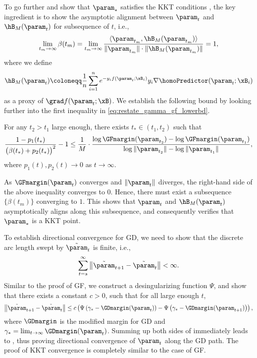 To go further and show that $\param_*$ satisfies the KKT conditions , the key ingredient is to show the asymptotic alignment between $\param_t$ and $\hB_M(\param_t)$ for subsequence of $t$, i.e., 
\[
\lim_{t_m\to \infty}\beta(t_m) = \lim_{t_m\to \infty} \frac{\langle\param_{t_m}, \hB_M(\param_{t_m}) \rangle}{ \|\param_{t_m}\| \cdot \|\hB_M(\param_{t_m})\|} = 1,
\]
where we define
\begin{equation*}
    \hB_M(\param_t) \coloneqq  \frac{1}{n}\sum_{i=1}^n e^{-y_i f(\param_t;\xB_i)} y_i\nabla \homoPredictor(\param_t;\xB_i)
\end{equation*}
as a proxy of $\grad f (\param_t; \xB)$.
We establish the following bound by looking further into the first inequality in \cref{eq:restate_gamma_gf_lowerbd}. 
\begin{lemma} For any $t_2>t_1$ large enough, there exists $t_*\in (t_1,t_2)$ such that 
\[
    \frac{1 - p_1(t_*)}{\big(\beta(t_*) + p_2(t_*) \big)^2}-1 \le \frac{1}{M} \cdot \frac{\log \GFmargin(\param_{t_2}) - \log\GFmargin(\param_{t_1})}{\log \|\param_{t_2}\| - \log \|\param_{t_1}\|}, 
\]
where $p_1(t), p_2(t) \to 0$ as $t\to \infty$. 
\end{lemma}
As $\GFmargin (\param_t)$ converges and $\|\param_t\|$ diverges, the right-hand side of the above inequality converges to $0$. Hence, there must exist a subsequence $\{ \beta(t_m) \}$ converging to $1$. This shows that $\param_t$ and $\hB_M(\param_t)$ asymptotically aligns along this subsequence, and consequently verifies that $\param_*$ is a KKT point.

To establish directional convergence for GD, we need to show that the discrete arc length swept by $\tilde{\param}_t$ is finite, i.e., 
\begin{equation}\label{eq:gd_sketch_finite_arc}
    \sum_{t=s}^{\infty} \left\| \tilde{\param}_{t+1} - \tilde{\param}_t \right\| < \infty.
\end{equation}
Similar to the proof of GF, we construct a desingularizing function $\Psi$, and show that there exists a constant $c > 0$, such that for all large enough $t$,
\begin{equation}\label{eq:gd_sketch_desingular}
     \left\| \tilde{\param}_{t+1} - \tilde{\param}_t \right\| \leq c \left( \Psi \left(\gamma_*-\GDmargin (\param_t) \right) - \Psi \left(\gamma_*-\GDmargin (\param_{t+1}) \right) \right),
\end{equation}
where $\GDmargin$ is the modified margin for GD and $\gamma_* = \lim_{t \to \infty} \GDmargin (\param_{t})$. Summing up both sides of  immediately leads to , thus proving directional convergence of $\param_t$ along the GD path. The proof of KKT convergence is completely similar to the case of GF.

